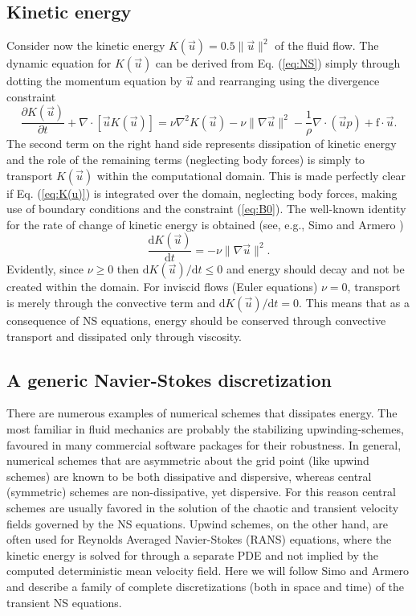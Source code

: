 \subsection{Kinetic energy}
\label{sec:kinetic}
Consider now the kinetic energy $K(\vec{u})=0.5 \| \vec{u}\|^2$ of the fluid flow. The dynamic equation for $K(\vec{u})$ can be derived from Eq. (\ref{eq:NS}) simply through dotting the momentum equation by $\vec{u}$ and rearranging using the divergence constraint
\begin{equation}
 \frac{\partial K(\vec{u})}{\partial t} + \nabla \cdot [\vec{u}K(\vec{u})] = \nu \nabla^2 K(\vec{u}) -\nu \| \nabla \vec{u} \|^2 - \frac{1}{\rho}\nabla \cdot \left(\vec{u}p \right) +\text{f}\cdot \vec{u}.
 \label{eq:K(u)}
\end{equation}
The second term on the right hand side represents dissipation of kinetic energy and the role of the remaining terms (neglecting body forces) is simply to transport $K(\vec{u})$ within the computational domain. This is made perfectly clear if Eq. (\ref{eq:K(u)}) is integrated over the domain, neglecting body forces, making use of boundary conditions and the constraint (\ref{eq:B0}). The well-known identity for the rate of change of kinetic energy is obtained (see, e.g., Simo and Armero \cite{simo94})
\begin{equation}
 \frac{\text{d} K(\vec{u})}{\text{d} t} = -\nu \| \nabla \vec{u} \|^2.
\end{equation}
Evidently, since $\nu \ge 0$ then $\text{d} K(\vec{u})/\text{d} t \le 0$ and energy should decay and not be created within the domain. For inviscid flows (Euler equations) $\nu=0$, transport is merely through the convective term and $\text{d} K(\vec{u})/\text{d} t = 0$. This means that as a consequence of NS equations, energy should be conserved through convective transport and dissipated only through viscosity.

\subsection{A generic Navier-Stokes discretization}
\label{sec:NS-solver}
There are numerous examples of numerical schemes that dissipates energy. The most familiar in fluid mechanics are probably the stabilizing upwinding-schemes, favoured in many commercial software packages for their robustness. In general, numerical schemes that are asymmetric about the grid point (like upwind schemes) are known to be both dissipative and dispersive, whereas central (symmetric) schemes are non-dissipative, yet dispersive. For this reason central schemes are usually favored in the solution of the chaotic and transient velocity fields governed by the NS equations. Upwind schemes, on the other hand, are often used for Reynolds Averaged Navier-Stokes (RANS) equations, where the kinetic energy is solved for through a separate PDE and not implied by the computed deterministic mean velocity field. Here we will follow Simo and Armero \cite{simo94} and describe a family of complete discretizations (both in space and time) of the transient NS equations.

